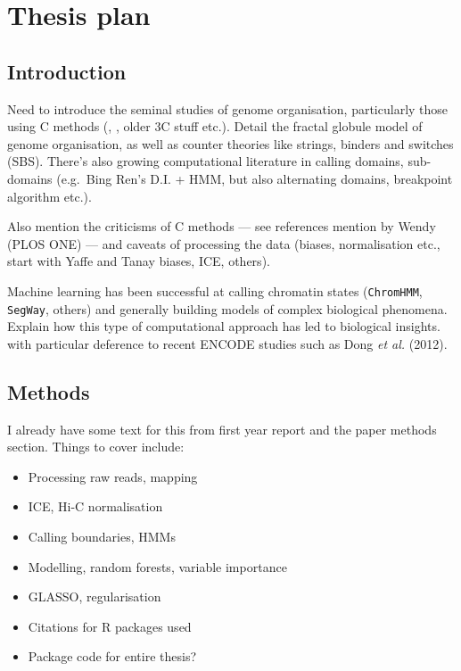 \documentclass[a4paper,10pt,oneside]{book}
\begin{document}
\chapter{Thesis plan}

\section{Introduction}\label{introduction}

Need to introduce the seminal studies of genome organisation,
particularly those using C methods (\citealt{Lieberman2011},
\citealt{Dixon2012}, older 3C stuff etc.). Detail the fractal globule
model of genome organisation, as well as counter theories like strings,
binders and switches (SBS). There's also growing computational
literature in calling domains, sub-domains (e.g.~Bing Ren's D.I. + HMM,
but also alternating domains, breakpoint algorithm etc.).

Also mention the criticisms of C methods --- see references mention by
Wendy (PLOS ONE) --- and caveats of processing the data (biases,
normalisation etc., start with Yaffe and Tanay biases, ICE, others).

Machine learning has been successful at calling chromatin states
(\texttt{ChromHMM}, \texttt{SegWay}, others) and generally building
models of complex biological phenomena. Explain how this type of
computational approach has led to biological insights. with particular
deference to recent ENCODE studies such as Dong \emph{et al.} (2012).

\section{Methods}\label{methods}

I already have some text for this from first year report and the paper
methods section. Things to cover include:

\begin{itemize}
\itemsep1pt\parskip0pt
\item
  Processing raw reads, mapping
\item
  ICE, Hi-C normalisation
\item
  Calling boundaries, HMMs
\item
  Modelling, random forests, variable importance
\item
  GLASSO, regularisation
\item
  Citations for R packages used
\item
  Package code for entire thesis?
\end{itemize}
\end{document}
